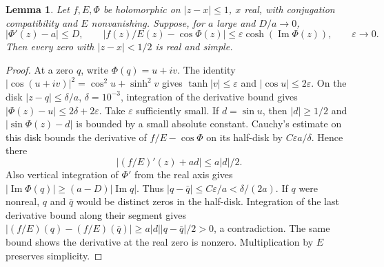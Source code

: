 \documentclass[11pt]{article}
\newtheorem{lemma}[theorem]{Lemma}
\begin{document}
\begin{lemma}\label{lem:cos}
Let $f,E,\Phi$ be holomorphic on $|z-x|\leq1$, $x$ real,
with conjugation compatibility and $E$ nonvanishing. Suppose,
for $a$ large and $D/a\to0$,
\[
 |\Phi'(z)-a|\leq D,\qquad
 |f(z)/E(z)-\cos\Phi(z)|\leq\varepsilon\cosh(\operatorname{Im}\Phi(z)),
 \qquad\varepsilon\to0.
\]
Then every zero with $|z-x|<1/2$ is real and simple.
\end{lemma}
\begin{proof}
At a zero $q$, write $\Phi(q)=u+iv$.
The identity $|\cos(u+iv)|^2=\cos^2u+\sinh^2v$
gives $\tanh|v|\leq\varepsilon$ and $|\cos u|\leq2\varepsilon$.
On the disk $|z-q|\leq\delta/a$, $\delta=10^{-3}$,
integration of the derivative bound gives
$|\Phi(z)-u|\leq2\delta+2\varepsilon$.
Take $\varepsilon$ sufficiently small. If $d=\sin u$, then
$|d|\geq1/2$ and $|\sin\Phi(z)-d|$ is bounded by a small
absolute constant. Cauchy's estimate on this disk bounds
the derivative of $f/E-\cos\Phi$ on its half-disk by
$C\varepsilon a/\delta$. Hence there
\[
 |(f/E)'(z)+ad|\leq a|d|/2.
\]
Also vertical integration of $\Phi'$ from the real axis
gives $|\operatorname{Im}\Phi(q)|\geq(a-D)|\operatorname{Im}q|$.
Thus $|q-\bar q|\leq C\varepsilon/a<\delta/(2a)$.
If $q$ were nonreal, $q$ and $\bar q$ would be distinct
zeros in the half-disk. Integration of the last derivative
bound along their segment gives
$|(f/E)(q)-(f/E)(\bar q)|\geq a|d||q-\bar q|/2>0$,
a contradiction. The same bound shows the derivative at
the real zero is nonzero. Multiplication by $E$ preserves simplicity.
\end{proof}
\end{document}
